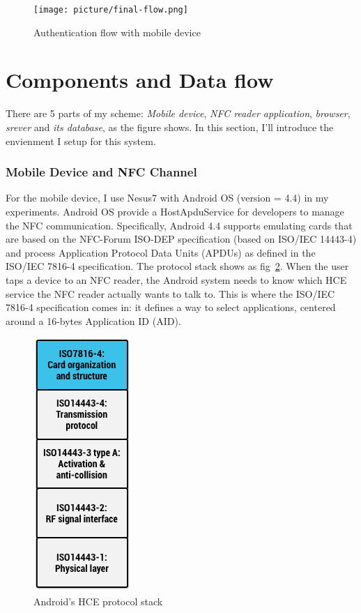 \begin{CJK}{Bg5}{bsmi}
\begin{figure}
\centering
\texttt{[image: picture/final-flow.png]}
\caption{Authentication flow with mobile device}
\label{fig:final-flow}
\end{figure}

\section{Components and Data flow}

There are 5 parts of my scheme: \emph{Mobile device}, \emph{NFC reader application}, \emph{browser}, \emph{srever} and \emph{its database}, as the figure shows. In this section, I'll introduce the envienment I setup for this system.

\subsubsection{Mobile Device and NFC Channel}

For the mobile device, I use Nesus7 with Android OS (version = 4.4) in my experiments. Android OS provide a HostApduService for developers to manage the NFC communication. Specifically, Android 4.4 supports emulating cards that are based on the NFC-Forum ISO-DEP specification (based on ISO/IEC 14443-4) and process Application Protocol Data Units (APDUs) as defined in the ISO/IEC 7816-4 specification. The protocol stack shows as fig~\ref{fig:protocol-stack}. When the user taps a device to an NFC reader, the Android system needs to know which HCE service the NFC reader actually wants to talk to. This is where the ISO/IEC 7816-4 specification comes in: it defines a way to select applications, centered around a 16-bytes Application ID (AID).

\begin{figure}
\centering
\includegraphics[scale=0.7]{picture/protocol-stack.png}
\caption{Android's HCE protocol stack\cite{nfc-hce-stack}}
\label{fig:protocol-stack}
\end{figure}


\end{CJK}
